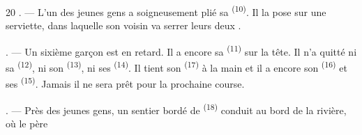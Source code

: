 \begin{VUpage}[22]{20}
. --- L'un des jeunes gens a soigneusement plié\nl
sa  \textsuperscript{(10)}. Il la pose sur une serviette, dans\nl
laquelle son voisin va serrer leurs deux .

. --- Un sixième garçon est en retard. Il a encore\nl
sa  \textsuperscript{(11)} sur la tête. Il n'a quitté ni sa \cc
{} \textsuperscript{(12)}, ni son  \textsuperscript{(13)}, ni ses  \textsuperscript{(14)}. Il\nl
tient son  \textsuperscript{(17)} à la main et il a encore son \cc
{} \textsuperscript{(16)} et ses  \textsuperscript{(15)}. Jamais il ne sera prêt\nl
pour la prochaine course.

. --- Près des jeunes gens, un sentier bordé de\nl
{} \textsuperscript{(18)} conduit au bord de la rivière, où le père
\parplein
\end{VUpage}

